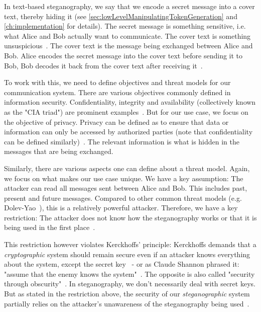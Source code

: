 In text-based steganography, we say that we encode a secret message into a cover text, thereby hiding it (see \cref{sec:lowLevelManipulatingTokenGeneration} and \cref{ch:implementation} for details). The secret message is something sensitive, i.e. what Alice and Bob actually want to communicate. The cover text is something unsuspicious~\cite{al-aniOverviewMainFundamentals2010}. The cover text is the message being exchanged between Alice and Bob. Alice encodes the secret message into the cover text before sending it to Bob, Bob decodes it back from the cover text after receiving it~\cite{al-aniOverviewMainFundamentals2010}.

To work with this, we need to define objectives and threat models for our communication system. There are various objectives commonly defined in information security. Confidentiality, integrity and availability (collectively known as the "CIA triad") are prominent examples~\cite{aliIoTSecurityReview2019,qadirReviewPaperCryptography2019,chowdhuryChatGPTThreatCIA2023}. But for our use case, we focus on the objective of privacy. Privacy can be defined as to ensure that data or information can only be accessed by authorized parties (note that confidentiality can be defined similarly)~\cite{chowdhuryChatGPTThreatCIA2023}. The relevant information is what is hidden in the messages that are being exchanged.

Similarly, there are various aspects one can define about a threat model. Again, we focus on what makes our use case unique. We have a key assumption: The attacker can read all messages sent between Alice and Bob. This includes past, present and future messages. Compared to other common threat models (e.g. Dolev-Yao~\cite{dolevSecurityPublicKey1983}), this is a relatively powerful attacker. Therefore, we have a key restriction: The attacker does not know how the steganography works or that it is being used in the first place~\cite{al-aniOverviewMainFundamentals2010}.

This restriction however violates Kerckhoffs' principle: Kerckhoffs demands that a \textit{cryptographic} system should remain secure even if an attacker knows everything about the system, except the secret key~\cite{andersonLimitsSteganography1998,smithEffectiveSecurityObscurity2022} - or as Claude Shannon phrased it: "assume that the enemy knows the system"~\cite{shannonCommunicationTheorySecrecy1949}. The opposite is also called "security through obscurity"~\cite{smithEffectiveSecurityObscurity2022}. In steganography, we don't necessarily deal with secret keys. But as stated in the restriction above, the security of our \textit{steganographic} system partially relies on the attacker's unawareness of the steganography being used~\cite{al-aniOverviewMainFundamentals2010}.

